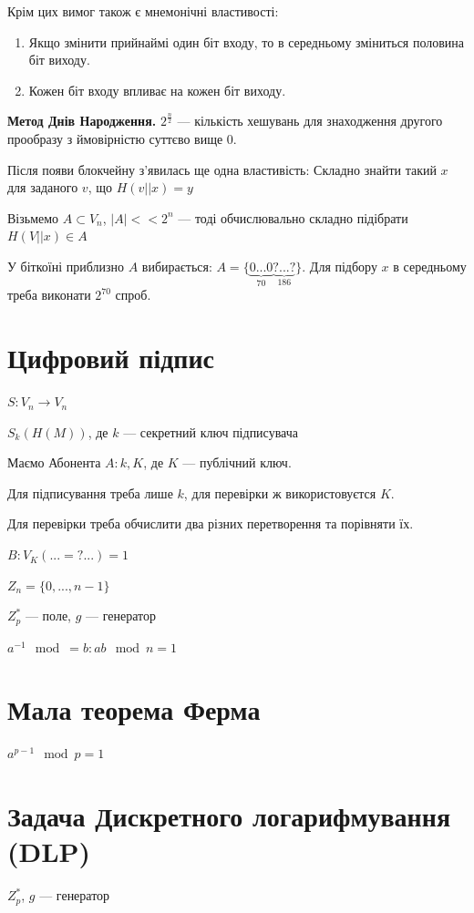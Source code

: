 \documentclass{article}
\begin{document}
        Крім цих вимог також є мнемонічні властивості:
        \begin{enumerate}
            \item Якщо змінити прийнаймі один біт входу, то в середньому зміниться половина біт виходу.
            \item Кожен біт входу впливає на кожен біт виходу.
        \end{enumerate}
        
        \textbf{Метод Днів Народження.} $2^{\frac{n}{2}}$ --- кількість хешувань для знаходження другого прообразу з ймовірністю суттєво вище 0.

        Після появи блокчейну з'явилась ще одна властивість: Складно знайти такий $ x $ для заданого $ v $, що $H(v||x) = y$

        Візьмемо $A \subset V_n$, $|A| << 2^n$ --- тоді обчислювально складно підібрати $H(V||x) \in A$

        У біткоїні приблизно $A$ вибирається: $A = \{ \underbrace{0 ... 0}_{70}  \underbrace{? ... ?}_{186} \}$. Для підбору $ x $ в середньому треба виконати $2^{70}$ спроб.

    \section{Цифровий підпис}
        $S: V_n \longrightarrow V_n$

        $S_k(H(M))$, де $k$ --- секретний ключ підписувача 
        
        Маємо Абонента
        $A: k, K$, де $K$ --- публічний ключ. 
        
        Для підписування треба лише $k$, для перевірки ж використовуєтся $K$.
        
        Для перевірки треба обчислити два різних перетворення та порівняти їх.
        
        $B: V_K(... =? ...) = 1$

        $Z_n = \{ 0, ..., n-1\}$

        $Z_p^*$ --- поле, $g$ --- генератор

        $a^{-1} \mod = b: ab \mod n = 1$
    
    \section{Мала теорема Ферма}
        $a^{p-1}\mod{p} = 1$

        \section{Задача Дискретного логарифмування (DLP)}
        $Z_p^*$, $g$ --- генератор
\end{document}
